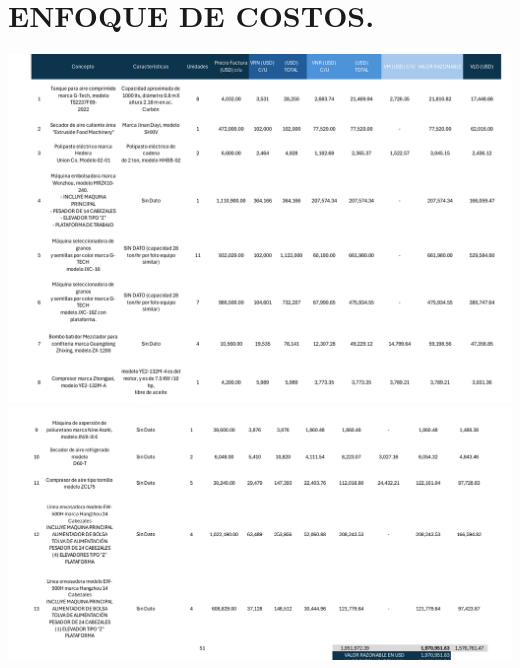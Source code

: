 
\chapter{ENFOQUE DE COSTOS.} %

\includegraphics[width=  \linewidth, page = 1]{../0.imagenes/enfoque_costos/1}
\newpage
\includegraphics[width=  \linewidth, page = 1]{../0.imagenes/enfoque_costos/2}


